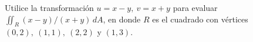 \item Utilice la transformación $u = x - y, \ v = x + y$ para evaluar $\iint_R (x - y)/(x + y) \, dA$, en donde $R$ es el cuadrado con vértices $(0, 2), \ (1, 1), \ (2, 2)$ y $(1, 3)$.
